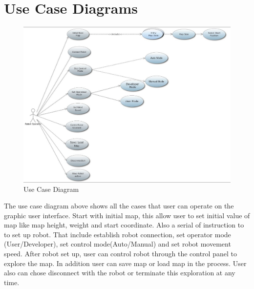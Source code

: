 \documentclass[11pt, a4paper]{report}
\begin{document}
\section{Use Case Diagrams}
\begin{figure}[h]
  \centering
    \includegraphics[width=16cm]{SEP_13_UseCase.jpg}
  \caption{Use Case Diagram}
\end{figure}
The use case diagram above shows all the cases that user can operate on the graphic user interface. Start with initial map, this allow user to set initial value of map like map height, weight and start coordinate. Also a serial of instruction to to set up robot. That include establish robot connection, set operator mode (User/Developer), set control mode(Auto/Manual) and set robot movement speed. After robot set up, user can control robot through the control panel to explore the map. In addition user can save map or load map in the process. User also can chose disconnect with the robot or terminate this exploration at any time.
\newpage
\end{document}
